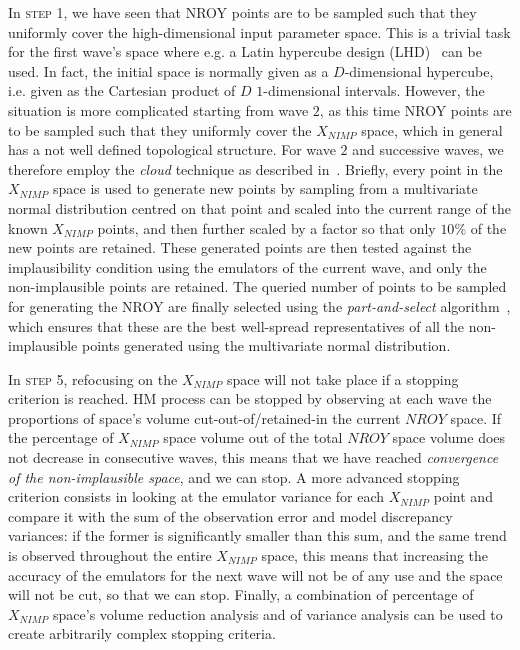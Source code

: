 \vspace{0.2cm}
In \textsc{step 1}, we have seen that NROY points are to be sampled such that they uniformly cover the high-dimensional input parameter space. This is a trivial task for the first wave's space where e.g. a Latin hypercube design (\acs{LHD})~\cite{Iman:1981} can be used. In fact, the initial space is normally given as a $D$-dimensional hypercube, i.e. given as the Cartesian product of $D$ $1$-dimensional intervals. However, the situation is more complicated starting from wave $2$, as this time NROY points are to be sampled such that they uniformly cover the $X_{NIMP}$ space, which in general has a not well defined topological structure. For wave $2$ and successive waves, we therefore employ the \textit{cloud} technique as described in~\cite{Coveney:2018}. Briefly, every point in the $X_{NIMP}$ space is used to generate new points by sampling from a multivariate normal distribution centred on that point and scaled into the current range of the known $X_{NIMP}$ points, and then further scaled by a factor so that only $10\%$ of the new points are retained. These generated points are then tested against the implausibility condition using the emulators of the current wave, and only the non-implausible points are retained. The queried number of points to be sampled for generating the NROY are finally selected using the \textit{part-and-select} algorithm~\cite{Salomon:2013}, which ensures that these are the best well-spread representatives of all the non-implausible points generated using the multivariate normal distribution. 

\vspace{0.2cm}
In \textsc{step 5}, refocusing on the $X_{NIMP}$ space will not take place if a stopping criterion is reached. HM process can be stopped by observing at each wave the proportions of space's volume cut-out-of/retained-in the current $NROY$ space. If the percentage of $X_{NIMP}$ space volume out of the total $NROY$ space volume does not decrease in consecutive waves, this means that we have reached \textit{convergence of the non-implausible space}, and we can stop. A more advanced stopping criterion consists in looking at the emulator variance for each $X_{NIMP}$ point and compare it with the sum of the observation error and model discrepancy variances: if the former is significantly smaller than this sum, and the same trend is observed throughout the entire $X_{NIMP}$ space, this means that increasing the accuracy of the emulators for the next wave will not be of any use and the space will not be cut, so that we can stop. Finally, a combination of percentage of $X_{NIMP}$ space's volume reduction analysis and of variance analysis can be used to create arbitrarily complex stopping criteria.




